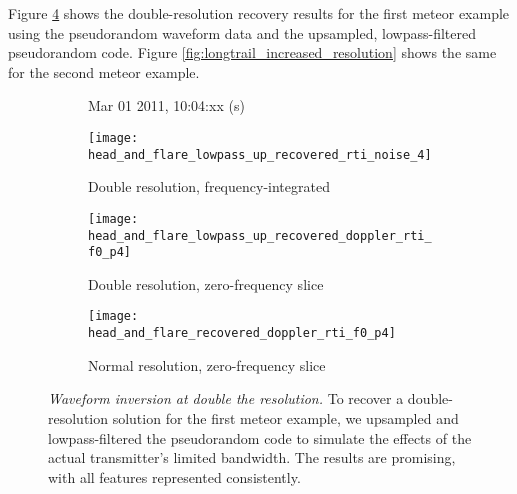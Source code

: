 Figure \ref{fig:increased_resolution_comparison} shows the double-resolution recovery results for the first meteor example using the pseudorandom waveform data and the upsampled, lowpass-filtered pseudorandom code. Figure \ref{fig:longtrail_increased_resolution} shows the same for the second meteor example.
\begin{figure}[tpb]
 \vspace{-1.5\baselineskip}
 \begin{subfigure}{\textwidth}
  \centering
  \textsf{\footnotesize Mar 01 2011, 10:04:xx (s)}
  
  \texttt{[image: head\_and\_flare\_lowpass\_up\_recovered\_rti\_noise\_4]}
  \caption{Double resolution, frequency-integrated}
  \label{fig:lowpass_up_recovered}
 \end{subfigure}
 
 \vspace{0.5\baselineskip}
 \begin{subfigure}{\textwidth}
  \centering
  \texttt{[image: head\_and\_flare\_lowpass\_up\_recovered\_doppler\_rti\_f0\_p4]}
  \caption{Double resolution, zero-frequency slice}
  \label{fig:lowpass_up_recovered_doppler0}
 \end{subfigure}
 
 \vspace{0.5\baselineskip}
 \begin{subfigure}{\textwidth}
  \centering
  \texttt{[image: head\_and\_flare\_recovered\_doppler\_rti\_f0\_p4]}
  \caption{Normal resolution, zero-frequency slice}
  \label{fig:recovered_doppler0_again}
 \end{subfigure}
 \caption[Waveform inversion at double the resolution]{\emph{Waveform inversion at double the resolution.} To recover a double-resolution solution for the first meteor example, we upsampled and lowpass-filtered the pseudorandom code to simulate the effects of the actual transmitter's limited bandwidth. The results are promising, with all features represented consistently.}
 \label{fig:increased_resolution_comparison}
\end{figure}%
